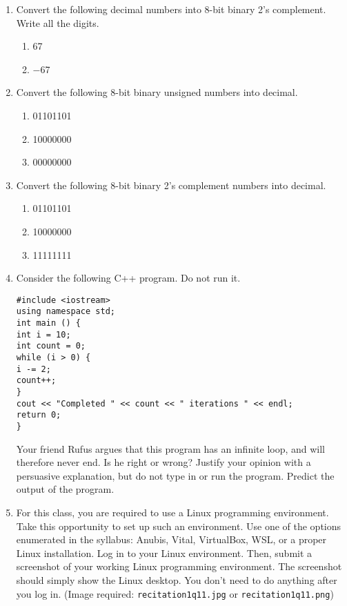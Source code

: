 \documentclass{article}
\begin{document}
\begin{enumerate}
    \item Convert the following decimal numbers into 8-bit binary 2’s complement. Write all the digits.
    \begin{enumerate}
        \item 67
        \item −67
    \end{enumerate}

    \item Convert the following 8-bit binary unsigned numbers into decimal.
    \begin{enumerate}
        \item 01101101
        \item 10000000
        \item 00000000
    \end{enumerate}

    \item Convert the following 8-bit binary 2’s complement numbers into decimal.
    \begin{enumerate}
        \item 01101101
        \item 10000000
        \item 11111111
    \end{enumerate}

    \item Consider the following C++ program. Do not run it.
    \begin{verbatim}
#include <iostream>
using namespace std;
int main () {
int i = 10;
int count = 0;
while (i > 0) {
i -= 2;
count++;
}
cout << "Completed " << count << " iterations " << endl;
return 0;
}
    \end{verbatim}
Your friend Rufus argues that this program has an infinite loop, and will therefore never end. Is he right or wrong? Justify your opinion with a persuasive explanation, but do not type in or run the program. Predict the output of the program.

    \item For this class, you are required to use a Linux programming environment. Take this opportunity to set up such an environment. Use one of the options enumerated in the syllabus: Anubis, Vital, VirtualBox, WSL, or a proper Linux installation.
Log in to your Linux environment. Then, submit a screenshot of your working Linux programming environment. The screenshot should simply show the Linux desktop. You don’t need to do anything after you log in. (Image required: \texttt{recitation1q11.jpg} or \texttt{recitation1q11.png})


\end{enumerate}
\end{document}
